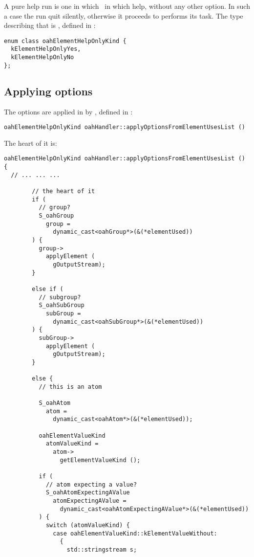 {A pure help run is one in which \mf\ in which help, without any other option. In such a case the run quit silently, otherwise it proceeds to performs its task. The type describing that is , defined in :
\begin{lstlisting}[language=CPlusPlus]
enum class oahElementHelpOnlyKind {
  kElementHelpOnlyYes,
  kElementHelpOnlyNo
};
\end{lstlisting}


	\subsection{Applying options}

The options are applied in  by , defined in :
\begin{lstlisting}[language=CPlusPlus]
oahElementHelpOnlyKind oahHandler::applyOptionsFromElementUsesList ()
\end{lstlisting}

The heart of it is:
\begin{lstlisting}[language=CPlusPlus]
oahElementHelpOnlyKind oahHandler::applyOptionsFromElementUsesList ()
{
  // ... ... ...

        // the heart of it
        if (
          // group?
          S_oahGroup
            group =
              dynamic_cast<oahGroup*>(&(*elementUsed))
        ) {
          group->
            applyElement (
              gOutputStream);
        }

        else if (
          // subgroup?
          S_oahSubGroup
            subGroup =
              dynamic_cast<oahSubGroup*>(&(*elementUsed))
        ) {
          subGroup->
            applyElement (
              gOutputStream);
        }

        else {
          // this is an atom

          S_oahAtom
            atom =
              dynamic_cast<oahAtom*>(&(*elementUsed));

          oahElementValueKind
            atomValueKind =
              atom->
                getElementValueKind ();

          if (
            // atom expecting a value?
            S_oahAtomExpectingAValue
              atomExpectingAValue =
                dynamic_cast<oahAtomExpectingAValue*>(&(*elementUsed))
          ) {
            switch (atomValueKind) {
              case oahElementValueKind::kElementValueWithout:
                {
                  std::stringstream s;


\end{lstlisting}}

